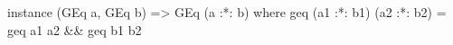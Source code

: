 \begin{code}
instance (GEq a, GEq b) => GEq (a :*: b) where
  geq (a1 :*: b1) (a2 :*: b2) = geq a1 a2 && geq b1 b2
\end{code}
